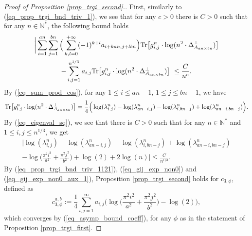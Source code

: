 \documentclass[12pt]{article}
\numberwithin{equation}{section}
\theoremstyle{theorem}
\theoremstyle{definition}
\theoremstyle{remark}
\newcommand{\nat}{\mathbb{N}}
\newcommand{\laplcomp}{\Delta}
\newcommand{\tr}[1]{{\rm{Tr}} \big[ #1 \big]}
\begin{document}
		\begin{proof}[Proof of Proposition \ref{prop_trgi_second}.]
			First, similarly to (\ref{eq_prop_trgi_bnd_triv_1}), we see that for any $c > 0$ there is $C > 0$ such that for any $n \in \nat^*$, the following bound holds
			\begin{multline}\label{eq_prop_trgi_bnd_triv_1121}
				\bigg|
					\sum_{i = 1}^{an} \sum_{j = 1}^{bn} \Big( \sum_{k, l = 0}^{+\infty} (-1)^{k + l} a_{i + kan, j + lbn} \Big) \tr{g_{i, j}^{n} \cdot \log (n^2 \cdot \laplcomp_{A_{an \times bn}}^{\perp})}
					\\
					-
					\sum_{i, j = 1}^{n^{1/3}} a_{i, j} \tr{g_{i, j}^{n} \cdot \log (n^2 \cdot \laplcomp_{A_{an \times bn}}^{\perp})}
				\bigg|
				\leq
				\frac{C}{n^c}.
			\end{multline}
			By (\ref{eq_sum_prod_cos}), for any $1 \leq i \leq an - 1$, $1 \leq j \leq bn - 1$, we have
			\begin{equation}\label{eq_gij_exp_non0}
				\tr{g_{i, j}^{n} \cdot \log (n^2 \cdot \laplcomp_{A_{an \times bn}}^{\perp})}
				=
				\frac{1}{4}
				\Big(
					\log(\lambda_{i, j}^{n})
					-
					\log(\lambda_{an - i, j}^{n})
					-
					\log(\lambda_{i, bn - j}^{n})
					+
					\log(\lambda_{an - i, bn - j}^{n})
				\Big).
			\end{equation}
			By (\ref{eq_eigenval_sq}), we see that there is $C > 0$ such that for any $n \in \nat^*$ and $1 \leq i, j \leq n^{1/3}$, we get
			\begin{multline}\label{eq_gij_exp_non0_aux_1}
				\Big|
					\log(\lambda_{i, j}^{n})
					-
					\log(\lambda_{an - i, j}^{n})
					-
					\log(\lambda_{i, bn - j}^{n})
					+
					\log(\lambda_{an - i, bn - j}^{n})
				\\
				-
				\log 
				\Big( 
					\frac{\pi^2 i^2}{a^2} + \frac{\pi^2 j^2}{b^2}
				\Big)
				+
				\log(2)
				+
				2
				\log ( n )
				\Big|
				\leq
				\frac{C}{n^{1/3}}.
			\end{multline}
			By (\ref{eq_prop_trgi_bnd_triv_1121}), (\ref{eq_gij_exp_non0}) and (\ref{eq_gij_exp_non0_aux_1}), Proposition \ref{prop_trgi_second} holds for $c_{3, \phi}$, defined as
			\begin{equation}\label{eq_gij_exp_non0_aux_2}
				c_{3, \phi}^{a, b} := 
				\frac{1}{4}
				\sum_{i, j = 1}^{\infty} 
				a_{i, j} 
				\Big(
					\log 
					\Big( 
						\frac{\pi^2 i^2}{a^2} + \frac{\pi^2 j^2}{b^2}
					\Big)
					-
					\log(2)
				\Big),
			\end{equation}
			which converges by (\ref{eq_asymp_bound_coeff}), for any $\phi$ as in the statement of Proposition \ref{prop_trgi_first}.
		\end{proof}
\end{document}
